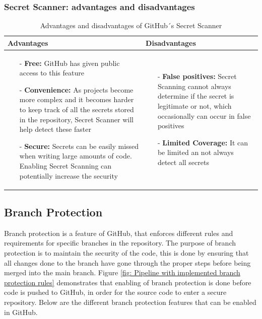 \subsubsection{Secret Scanner: advantages and disadvantages}
\begin{table}[H]
\centering
\begin{tabular}{|>{\raggedright\arraybackslash}p{6cm}|>{\raggedright\arraybackslash}p{6cm}|}
\hline
\textbf{Advantages} & \textbf{Disadvantages} \\
\hline
\begin{itemize}
\item [-] \textbf{Free:} GitHub has given public access to this feature 
\item [-]\textbf{Convenience:} As projects become more complex and it becomes harder to keep track of all the secrets stored in the repository, Secret Scanner will help detect these faster 
\item [-] \textbf{Secure:} Secrets can be easily missed when writing large amounts of code. Enabling Secret Scanning can potentially increase the security 
\end{itemize}
&
   \begin{itemize}
\item [-] \textbf{False positives:} Secret Scanning cannot always determine if the secret is legitimate or not, which occasionally can occur in false positives
\item [-] \textbf{Limited Coverage:} It can be limited an not always detect all secrets
\end{itemize}
\\
\hline
\end{tabular}
\caption{Advantages and disadvantages of GitHub´s Secret Scanner}\cite{Secret_Scanner_pros_cons}
\label{tab: Secret_Scanner}
\end{table}


\subsection{Branch Protection}
\label{branchprotection}
Branch protection is a feature of GitHub, that enforces different rules and requirements for specific branches in the repository. The purpose of branch protection is to maintain the security of the code, this is done by ensuring that all changes done to the branch have gone through the proper steps before being merged into the main branch. Figure \ref{fig: Pipeline with implemented branch protection rules} demonstrates that enabling of branch protection is done before code is pushed to GitHub, in order for the source code to enter a secure repository. Below are the different branch protection features that can be enabled in GitHub. \cite{ProtectedBranches}

